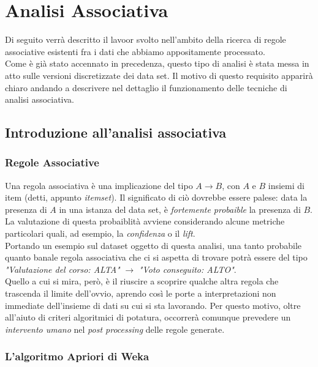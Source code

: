 \chapter{Analisi Associativa}

Di seguito verrà descritto il lavoor svolto nell'ambito della ricerca di regole associative esistenti fra i dati che abbiamo appositamente processato. \\

Come è già stato accennato in precedenza, questo tipo di analisi è stata messa in atto sulle versioni discretizzate dei data set. Il motivo di questo requisito apparirà chiaro andando a descrivere nel dettaglio il funzionamento delle tecniche di analisi associativa.

\section{Introduzione all'analisi associativa}

    \subsection{Regole Associative}

        Una regola associativa è una implicazione del tipo $A \rightarrow B$, con $A$ e $B$ insiemi di item (detti, appunto \textit{itemset}). Il significato di ciò dovrebbe essere palese: data la presenza di $A$ in una istanza del data set, è \textit{fortemente probaible} la presenza di $B$. La valutazione di questa probaiblità avviene considerando alcune metriche particolari quali, ad esempio, la \textit{confidenza} o il \textit{lift}. \\

        Portando un esempio sul dataset oggetto di questa analisi, una tanto probabile quanto banale regola associativa che ci si aspetta di trovare potrà essere del tipo \textit{"Valutazione del corso: ALTA"} $\rightarrow$ \textit{"Voto conseguito: ALTO"}. \\
        
        Quello a cui si mira, però, è il riuscire a scoprire qualche altra regola che trascenda il limite dell'ovvio, aprendo così le porte a interpretazioni non immediate dell'insieme di dati su cui si sta lavorando. Per questo motivo, oltre all'aiuto di criteri algoritmici di potatura, occorrerà comunque prevedere un \textit{intervento umano} nel \textit{post processing} delle regole generate.

    \subsection{L'algoritmo Apriori di Weka}

